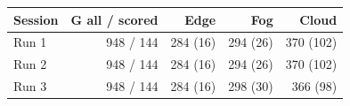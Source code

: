 \begin{table}[H]
\centering
\label{table:nodes:start}
\begin{tabular}{lrrrr}
\toprule
\textbf{Session} & \textbf{G all / scored} & \textbf{Edge} & \textbf{Fog} & \textbf{Cloud} \\
\midrule
Run 1 & 948 / 144 & 284 (16) & 294 (26) & 370 (102) \\
Run 2 & 948 / 144 & 284 (16) & 294 (26) & 370 (102) \\
Run 3 & 948 / 144 & 284 (16) & 298 (30) & 366 (98) \\
\bottomrule
\end{tabular}
\label{table:nodes:end}
\end{table}
